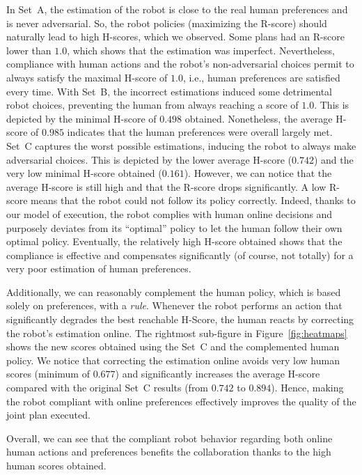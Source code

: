 In Set~A, the estimation of the robot is close to the real human preferences and is never adversarial. So, the robot policies (maximizing the R-score) should naturally lead to high H-scores, which we observed.
Some plans had an R-score lower than $1.0$, which shows that the estimation was imperfect. Nevertheless, compliance with human actions and the robot's non-adversarial choices permit to always satisfy the maximal H-score of $1.0$, i.e., human preferences are satisfied every time. 
With Set~B, the incorrect estimations induced some detrimental robot choices, preventing the human from always reaching a score of $1.0$. This is depicted by the minimal H-score of $0.498$ obtained. Nonetheless, the average H-score of $0.985$ indicates that the human preferences were overall largely met.
Set~C captures the worst possible estimations, inducing the robot to always make adversarial choices. This is depicted by the lower average H-score ($0.742$) and the very low minimal H-score obtained ($0.161$). 
However, we can notice that the average H-score is still high and that the R-score drops significantly. A low R-score means that the robot could not follow its policy correctly. Indeed, thanks to our model of execution, the robot complies with human online decisions and purposely deviates from its ``optimal'' policy to let the human follow their own optimal policy. Eventually, the relatively high H-score obtained shows that the compliance is effective and compensates significantly (of course, not totally) for a very poor estimation of human preferences. 

Additionally, we can reasonably complement the human policy, which is based solely on preferences, with a \textit{rule}. Whenever the robot performs an action that significantly degrades the best reachable H-Score, the human reacts by correcting the robot's estimation online.
The rightmost sub-figure in Figure~\ref{fig:heatmaps} shows the new scores obtained using the Set~C and the complemented human policy. 
We notice that correcting the estimation online avoids very low human scores (minimum of $0.677$) and significantly increases the average H-score compared with the original Set~C results (from $0.742$ to $0.894$). Hence, making the robot compliant with online preferences effectively improves the quality of the joint plan executed.

Overall, we can see that the compliant robot behavior regarding both online human actions and preferences benefits the collaboration thanks to the high human scores obtained.

